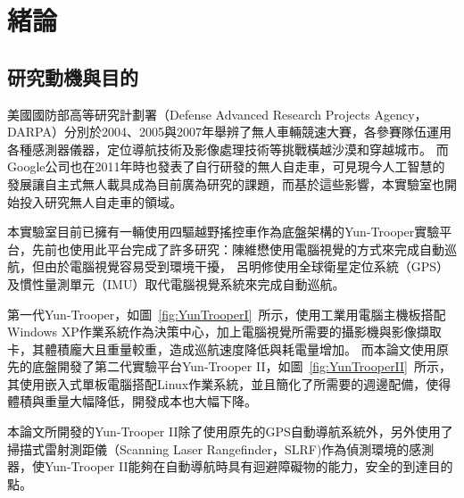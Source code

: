 \chapter{緒論}
\label{c:intro}
\section{研究動機與目的}
美國國防部高等研究計劃署（Defense Advanced Research Projects Agency，DARPA）分別於2004、2005與2007年舉辨了無人車輛競速大賽，各參賽隊伍運用各種感測器儀器，定位導航技術及影像處理技術等挑戰橫越沙漠和穿越城市。
而Google公司也在2011年時也發表了自行研發的無人自走車，可見現今人工智慧的發展讓自主式無人載具成為目前廣為研究的課題，而基於這些影響，本實驗室也開始投入研究無人自走車的領域。

本實驗室目前已擁有一輛使用四驅越野搖控車作為底盤架構的Yun-Trooper實驗平台，先前也使用此平台完成了許多研究：陳維懋\cite{chen:2011:Thesis}使用電腦視覺的方式來完成自動巡航，但由於電腦視覺容易受到環境干擾，
呂明修\cite{Liu:2012:Thesis}使用全球衛星定位系統（GPS）及慣性量測單元（IMU）取代電腦視覺系統來完成自動巡航。

第一代Yun-Trooper，如圖~\ref{fig:YunTrooperI}~所示，使用工業用電腦主機板搭配Windows XP作業系統作為決策中心，加上電腦視覺所需要的攝影機與影像擷取卡，其體積龐大且重量較重，造成巡航速度降低與耗電量增加。
而本論文使用原先的底盤開發了第二代實驗平台Yun-Trooper II，如圖~\ref{fig:YunTrooperII}~所示，其使用嵌入式單板電腦搭配Linux作業系統，並且簡化了所需要的週邊配備，使得體積與重量大幅降低，開發成本也大幅下降。

本論文所開發的Yun-Trooper II除了使用原先的GPS自動導航系統外，另外使用了掃描式雷射測距儀（Scanning Laser Rangefinder，SLRF)作為偵測環境的感測器，使Yun-Trooper II能夠在自動導航時具有迴避障礙物的能力，安全的到達目的點。

